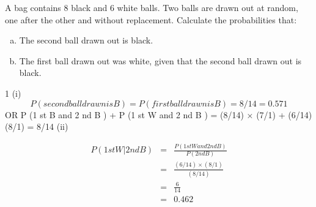 \documentclass[a4paper,12pt]{article}
\begin{document}
\large
\noindent A bag contains 8 black and 6 white balls. Two balls are drawn out at random, one
after the other and without replacement.
Calculate the probabilities that:

\begin{enumerate}[(a)]
\item The second ball drawn out is black.
\item The first ball drawn out was white, given that the second ball drawn out is
black.
\end{enumerate}


1
(i)
\[P (second ball drawn is B ) = P (first ball drawn is B ) = 8/14 = 0.571\]
OR P (1 st B and 2 nd B ) + P (1 st W and 2 nd B )
= (8/14) × (7/1) + (6/14) \times (8/1) = 8/14
(ii)

\begin{eqnarray*}
P (1 st W | 2 nd B ) &=& \frac{P (1 st W and 2 nd B )}{ P (2 nd B )} \\  
&=& \frac{ (6/14) \times (8/1) }{ (8/14) } \\
&=& \frac{6}{14} \\  &=& 0.462\\
\end{eqnarray*}
\end{document}

